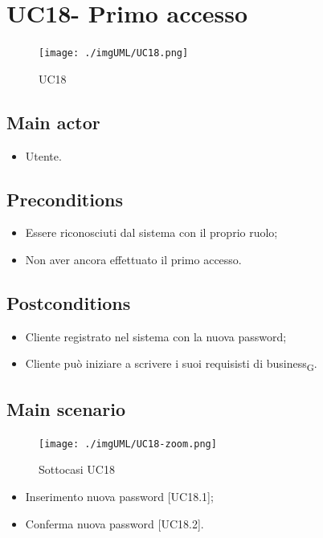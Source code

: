 \documentclass{article}
\begin{document}
\section{UC18- Primo accesso}
 \begin{figure}[h]
          \centering
          \texttt{[image: ./imgUML/UC18.png]}
            \caption{UC18}
          \label{fig:UC18}
        \end{figure}
\subsection*{Main actor}
        \begin{itemize}
            \item Utente.
        \end{itemize}
        
    \subsection*{Preconditions}
        \begin{itemize}
            \item Essere riconosciuti dal sistema con il proprio ruolo;
            \item Non aver ancora effettuato il primo accesso.
        \end{itemize}
        
    \subsection*{Postconditions}
        \begin{itemize}
            \item Cliente registrato nel sistema con la nuova password;
            \item Cliente può iniziare a scrivere i suoi requisisti di business\textsubscript{G}.
        \end{itemize}

        \subsection*{Main scenario}
        \begin{figure}[h]
          \centering
          \texttt{[image: ./imgUML/UC18-zoom.png]}
            \caption{Sottocasi UC18}
          \label{fig:UC18_sottocasi}
        \end{figure}
        
        \begin{itemize}
            \item Inserimento nuova password [UC18.1];
            \item Conferma nuova password [UC18.2].
        \end{itemize}
     
\end{document}
